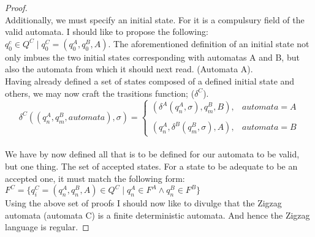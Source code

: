 \documentclass{article}
\begin{document}
\begin{proof}
\\
Additionally, we must specify an initial state. For it is a compulsury field of the valid automata. I should like to propose the following: \newline
$q_0^{c} \in Q^{C} \mid q_0^{C} = (q_0^{A}, q_0^{B}, A)$. \newline
The aforementioned definition of an initial state not only imbues the two initial states corresponding with automatas A and B, but also the automata from which it should next read. (Automata A). \newline
\\
Having already defined a set of states composed of a defined initial state and others, we may now craft the trasitions function; ($\delta^{C}$). \newline
\[
  \delta^{C} ((q_n^{A}, q_m^{B}, automata), \sigma) =
  \begin{cases}
    (\delta^{A}(q_n^{A}, \sigma), q_m^{B}, B), & automata = A\\\\
    (q_n^{A}, \delta^{B}(q_m^{B}, \sigma), A), & automata = B
  \end{cases}
\]
\\
We have by now defined all that is to be defined for our automata to be valid, but one thing. The set of accepted states. For a state to be adequate to be an accepted one, it must match the following form: \newline
$F^{C} = \{q_i^{C} = (q_n^{A}, q_n^{B}, A) \in Q^{C} \mid q_n^{A} \in F^{A} \wedge q_n^{B} \in F^{B}\}$ \newline
\\
Using the above set of proofs I should now like to divulge that the Zigzag automata (automata C) is a finite deterministic automata. And hence the Zigzag language is regular.
\end{proof}
\end{document}
